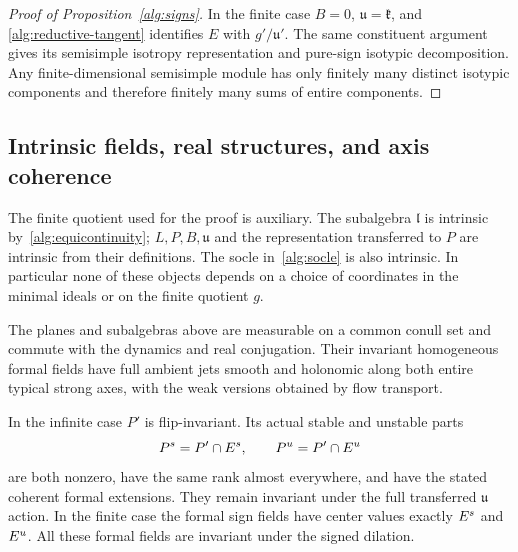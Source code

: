 \begin{proof}[Proof of Proposition~\ref{alg:signs}]
In the finite case $B=0$, $\mathfrak u=\mathfrak k$, and
\eqref{alg:reductive-tangent} identifies $E$ with
$g'/\mathfrak u'$. The same constituent argument gives its
semisimple isotropy representation and pure-sign isotypic
decomposition. Any finite-dimensional semisimple module has only
finitely many distinct isotypic components and therefore finitely
many sums of entire components.
\end{proof}

\subsection{Intrinsic fields, real structures, and axis coherence}

The finite quotient used for the proof is auxiliary. The subalgebra
$\mathfrak l$ is intrinsic by~\eqref{alg:equicontinuity};
$L,P,B,\mathfrak u$ and the representation transferred to $P$ are
intrinsic from their definitions. The socle in~\eqref{alg:socle}
is also intrinsic. In particular none of these objects depends on a
choice of coordinates in the minimal ideals or on the finite
quotient $g$.

\begin{proposition}
\label{alg:axis-coherence}
The planes and subalgebras above are measurable on a common conull
set and commute with the dynamics and real conjugation. Their
invariant homogeneous formal fields have full ambient jets smooth
and holonomic along both entire typical strong axes, with the weak
versions obtained by flow transport.

In the infinite case $P'$ is flip-invariant. Its actual stable and
unstable parts
\[
 P^s=P'\cap E^s,
 \qquad P^u=P'\cap E^u
\]
are both nonzero, have the same rank almost everywhere, and have
the stated coherent formal extensions. They remain invariant under
the full transferred $\mathfrak u$ action. In the finite case the
formal sign fields have center values exactly $E^s$ and $E^u$.
All these formal fields are invariant under the signed dilation.
\end{proposition}

